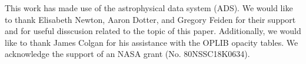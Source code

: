 \documentclass[twocolumn,linenumbers]{src/aastex631}
\begin{document}
\appendix



\begin{acknowledgments}
	This work has made use of the astrophysical data system (ADS). We would
	like to thank Elisabeth Newton, Aaron Dotter, and Gregory Feiden for their
	support and for useful disscusion related to the topic of this paper.
	Additionally, we would like to thank James Colgan for his assistance with
	the OPLIB opacity tables. We acknowledge the support of an NASA grant (No.
	80NSSC18K0634). 
\end{acknowledgments}



{}

\end{document}
